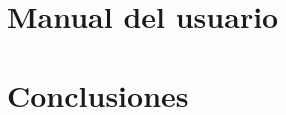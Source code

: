 \documentclass[11pt]{article}
\begin{document}


\section{Manual del usuario}



\section{Conclusiones}


\end{document}
